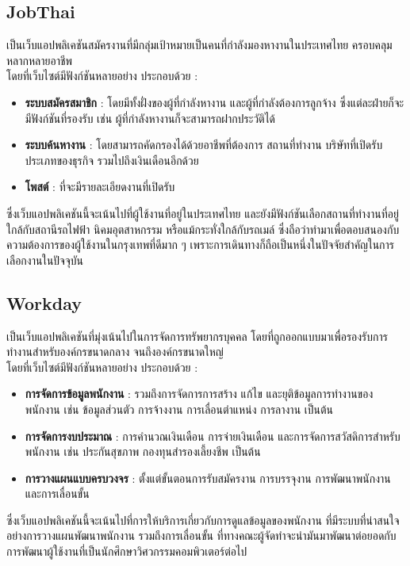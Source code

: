 \subsection{JobThai}
เป็นเว็บแอปพลิเคชันสมัครงานที่มีกลุ่มเป้าหมายเป็นคนที่กำลังมองหางานในประเทศไทย ครอบคลุมหลากหลายอาชีพ \\
โดยที่เว็บไซต์มีฟังก์ชันหลายอย่าง ประกอบด้วย :
\begin{itemize}
    \item \textbf{ระบบสมัครสมาชิก} : โดยมีทั้งฝั่งของผู้ที่กำลังหางาน และผู้ที่กำลังต้องการลูกจ้าง ซึ่งแต่ละฝ่ายก็จะมีฟังก์ชันที่รองรับ เช่น ผู้ที่กำลังหางานก็จะสามารถฝากประวัติได้
    \item \textbf{ระบบค้นหางาน} : โดยสามารถคัดกรองได้ด้วยอาชีพที่ต้องการ สถานที่ทำงาน บริษัทที่เปิดรับ ประเภทของธุรกิจ รวมไปถึงเงินเดือนอีกด้วย
    \item \textbf{โพสต์} : ที่จะมีรายละเอียดงานที่เปิดรับ
\end{itemize}
\par ซึ่งเว็บแอปพลิเคชันนี้จะเน้นไปที่ผู้ใช้งานที่อยู่ในประเทศไทย และยังมีฟังก์ชันเลือกสถานที่ทำงานที่อยู่ใกล้กับสถานีรถไฟฟ้า นิคมอุตสาหกรรม หรือแม้กระทั่งใกล้กับรถเมล์ 
ซึ่งถือว่าทำมาเพื่อตอบสนองกับความต้องการของผู้ใช้งานในกรุงเทพที่ดีมาก ๆ เพราะการเดินทางก็ถือเป็นหนึ่งในปัจจัยสำคัญในการเลือกงานในปัจจุบัน

\subsection{Workday}
เป็นเว็บแอปพลิเคชันที่มุ่งเน้นไปในการจัดการทรัพยากรบุคคล โดยที่ถูกออกแบบมาเพื่อรองรับการทำงานสำหรับองค์กรขนาดกลาง จนถึงองค์กรขนาดใหญ่ \\
โดยที่เว็บไซต์มีฟังก์ชันหลายอย่าง ประกอบด้วย :
\begin{itemize}
    \item \textbf{การจัดการข้อมูลพนักงาน} : รวมถึงการจัดการการสร้าง แก้ไข และยุติข้อมูลการทำงานของพนักงาน เช่น ข้อมูลส่วนตัว การจ้างงาน การเลื่อนตำแหน่ง การลางาน เป็นต้น 
    \item \textbf{การจัดการงบประมาณ} : การคำนวณเงินเดือน การจ่ายเงินเดือน และการจัดการสวัสดิการสำหรับพนักงาน เช่น ประกันสุขภาพ กองทุนสำรองเลี้ยงชีพ เป็นต้น
    \item \textbf{การวางแผนแบบครบวงจร} : ตั้งแต่ขั้นตอนการรับสมัครงาน การบรรจุงาน การพัฒนาพนักงาน และการเลื่อนขั้น
\end{itemize}
\par ซึ่งเว็บแอปพลิเคชันนี้จะเน้นไปที่การให้บริการเกี่ยวกับการดูแลข้อมูลของพนักงาน ที่มีระบบที่น่าสนใจอย่างการวางแผนพัฒนาพนักงาน 
รวมถึงการเลื่อนขั้น ที่ทางคณะผู้จัดทำจะนำมันมาพัฒนาต่อยอดกับการพัฒนาผู้ใช้งานที่เป็นนักศึกษาวิศวกรรมคอมพิวเตอร์ต่อไป


